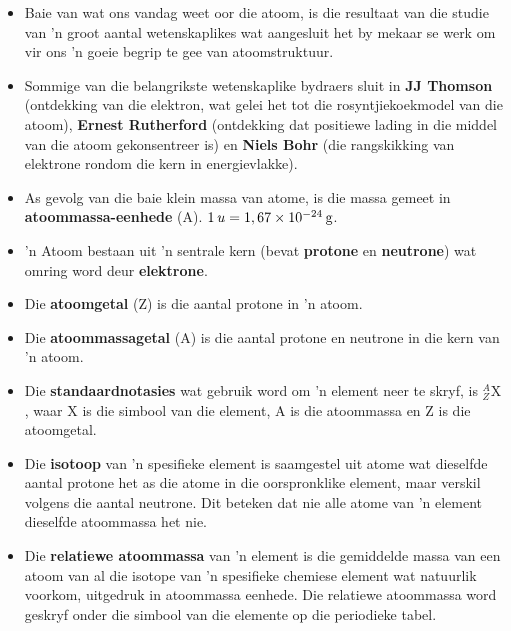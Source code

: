     \label{m38741*cid10}
\nopagebreak
\begin{itemize}[noitemsep]
\item Baie van wat ons vandag weet oor die atoom, is die resultaat van die studie van 'n groot aantal wetenskaplikes wat aangesluit het by mekaar se werk om vir ons 'n goeie begrip te gee van atoomstruktuur.
\item Sommige van die belangrikste wetenskaplike bydraers sluit in \textbf{JJ Thomson} (ontdekking van die elektron, wat gelei het tot die rosyntjiekoekmodel van die atoom), \textbf{Ernest Rutherford} (ontdekking dat positiewe lading in die middel van die atoom gekonsentreer is) en \textbf{Niels Bohr} (die rangskikking van elektrone rondom die kern in energievlakke).
\item As gevolg van die baie klein massa van atome, is die massa gemeet in \textbf{atoommassa-eenhede} (A). $1\phantom{\rule{2pt}{0ex}}u=1,67\ensuremath{\times}10{}^{-24}\phantom{\rule{2pt}{0ex}}\text{g}$.
\item 'n Atoom bestaan uit 'n sentrale kern (bevat \textbf{protone} en \textbf{neutrone}) wat omring word deur \textbf{elektrone}.
\item Die \textbf{atoomgetal} (Z) is die aantal protone in 'n atoom.
\item Die \textbf{atoommassagetal} (A) is die aantal protone en neutrone in die kern van 'n atoom.
\item Die \textbf{standaardnotasies} wat gebruik word om 'n element neer te skryf, is $_{Z}^{A}\text{X}$, waar X is die simbool van die element, A is die atoommassa en Z is die atoomgetal.
\item Die \textbf{isotoop} van 'n spesifieke element is saamgestel uit atome wat dieselfde aantal protone het as die atome in die oorspronklike element, maar verskil volgens die aantal neutrone. Dit beteken dat nie alle atome van 'n element dieselfde atoommassa het nie.
\item Die \textbf{relatiewe atoommassa} van 'n element is die gemiddelde massa van een atoom van al die isotope van 'n spesifieke chemiese element wat natuurlik voorkom, uitgedruk in atoommassa eenhede. Die relatiewe atoommassa word geskryf onder die simbool van die elemente op die periodieke tabel.

\end{itemize}

